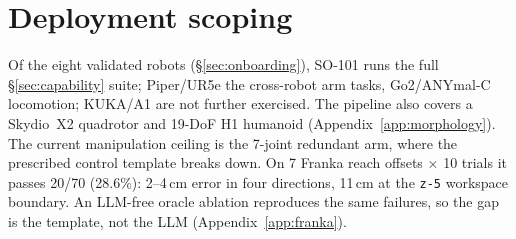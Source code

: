 \section{Deployment scoping}
\label{sec:scoping}
\label{sec:scoping-franka}

Of the eight validated robots (\S\ref{sec:onboarding}),
SO-101 runs the full \S\ref{sec:capability} suite; Piper/UR5e the
cross-robot arm tasks, Go2/ANYmal-C locomotion; KUKA/A1 are not
further exercised. The pipeline also covers a Skydio~X2 quadrotor
and 19-DoF H1 humanoid (Appendix~\ref{app:morphology}). The current manipulation ceiling is
the 7-joint redundant arm, where the prescribed control template
breaks down. On 7 Franka reach offsets $\times$ 10 trials it
passes 20/70 (28.6\%): 2--4\,cm error in four directions, 11\,cm
at the \texttt{z-5} workspace boundary. An LLM-free oracle ablation reproduces the same
failures, so the gap is the template, not the LLM
(Appendix~\ref{app:franka}).

